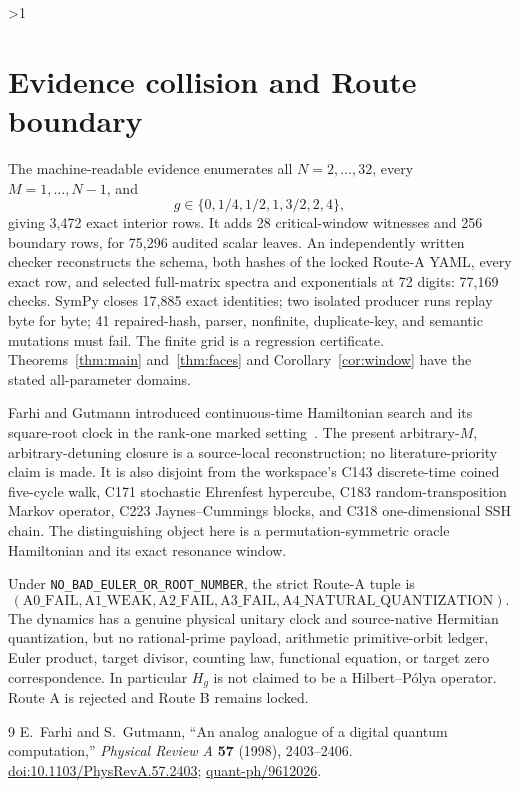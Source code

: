 \documentclass[10pt]{article}
\providecommand{\CRevisionRound}{2}
\begin{document}
\ifnum\CRevisionRound>1
\section{Evidence collision and Route boundary}
The machine-readable evidence enumerates all $N=2,\ldots,32$, every
$M=1,\ldots,N-1$, and
\[
 g\in\{0,1/4,1/2,1,3/2,2,4\},
\]
giving 3,472 exact interior rows.  It adds 28 critical-window witnesses and
256 boundary rows, for 75,296 audited scalar leaves.  An independently
written checker reconstructs the schema, both hashes of the locked Route-A
YAML, every exact row, and selected full-matrix spectra and exponentials at
72 digits: 77,169 checks.  SymPy closes 17,885 exact identities; two isolated
producer runs replay byte for byte; 41 repaired-hash, parser, nonfinite,
duplicate-key, and semantic mutations must fail.  The finite grid is a
regression certificate.  Theorems~\ref{thm:main} and~\ref{thm:faces} and
Corollary~\ref{cor:window} have the stated all-parameter domains.

Farhi and Gutmann introduced continuous-time Hamiltonian search and its
square-root clock in the rank-one marked setting~\cite{farhigutmann}.  The
present arbitrary-$M$, arbitrary-detuning closure is a source-local
reconstruction; no literature-priority claim is made.  It is also disjoint
from the workspace's C143 discrete-time coined five-cycle walk, C171
stochastic Ehrenfest hypercube, C183 random-transposition Markov operator,
C223 Jaynes--Cummings blocks, and C318 one-dimensional SSH chain.  The
distinguishing object here is a permutation-symmetric oracle Hamiltonian and
its exact resonance window.

Under \texttt{NO\_BAD\_EULER\_OR\_ROOT\_NUMBER}, the strict Route-A tuple is
\[
 (\mathrm{A0\_FAIL},\mathrm{A1\_WEAK},\mathrm{A2\_FAIL},
  \mathrm{A3\_FAIL},\mathrm{A4\_NATURAL\_QUANTIZATION}).
\]
The dynamics has a genuine physical unitary clock and source-native Hermitian
quantization, but no rational-prime payload, arithmetic primitive-orbit
ledger, Euler product, target divisor, counting law, functional equation, or
target zero correspondence.  In particular $H_g$ is not claimed to be a
Hilbert--P\'olya operator.  Route A is rejected and Route B remains locked.

\begin{thebibliography}{9}
E.~Farhi and S.~Gutmann,
``An analog analogue of a digital quantum computation,''
\emph{Physical Review A} \textbf{57} (1998), 2403--2406.
\href{https://doi.org/10.1103/PhysRevA.57.2403}{doi:10.1103/PhysRevA.57.2403};
\href{https://arxiv.org/abs/quant-ph/9612026}{quant-ph/9612026}.
\end{thebibliography}
\fi
\end{document}
